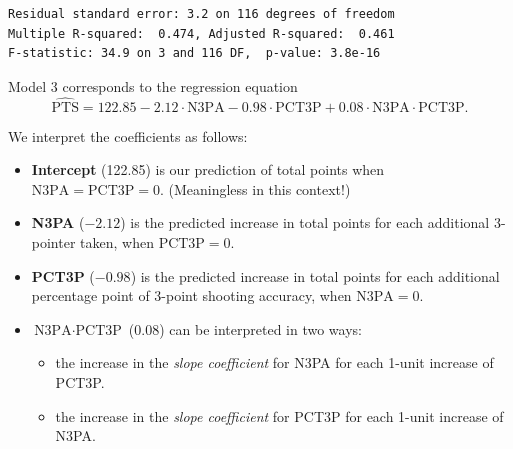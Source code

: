 \documentclass{beamer}\usepackage[]{graphicx}\usepackage[]{color}
\makeatletter
\newenvironment{kframe}{%
 \def\at@end@of@kframe{}%
 \ifinner\ifhmode%
  \def\at@end@of@kframe{\end{minipage}}%
  \begin{minipage}{\columnwidth}%
 \fi\fi%
 \def\FrameCommand##1{\hskip\@totalleftmargin \hskip-\fboxsep
 \colorbox{shadecolor}{##1}\hskip-\fboxsep
     \hskip-\linewidth \hskip-\@totalleftmargin \hskip\columnwidth}%
 \MakeFramed {\advance\hsize-\width
   \@totalleftmargin\z@ \linewidth\hsize
   \@setminipage}}%
 {\par\unskip\endMakeFramed%
 \at@end@of@kframe}
\newenvironment{knitrout}{}{} %
\makeatother
\begin{document}
\begin{darkframes}
\begin{frame}[fragile]
\begin{knitrout}
\begin{kframe}
\begin{verbatim}
Residual standard error: 3.2 on 116 degrees of freedom
Multiple R-squared:  0.474,	Adjusted R-squared:  0.461 
F-statistic: 34.9 on 3 and 116 DF,  p-value: 3.8e-16
\end{verbatim}
\end{kframe}
\end{knitrout}
\end{frame}

\begin{frame}[fragile]

      Model 3 corresponds to the regression equation
      \[
        \widehat{\text{PTS}} = 122.85 
          - 2.12 \cdot\text{N3PA}
          - 0.98 \cdot\text{PCT3P}
          + 0.08 \cdot\text{N3PA}\cdot\text{PCT3P}.
      \]

      \pause

      We interpret the coefficients as follows:
      \begin{itemize}[<+->]
        \item \textbf{Intercept} (122.85) is our prediction of total points when $\text{N3PA}=\text{PCT3P}=0$. (Meaningless in this context!)
        \item \textbf{N3PA} ($-2.12$) is the predicted increase in total points for each additional 3-pointer taken, when $\text{PCT3P}=0$.
        \item \textbf{PCT3P} ($-0.98$)  is the predicted increase in total points for each additional percentage point of 3-point shooting accuracy, when $\text{N3PA}=0$.
        \item \textbf{$\text{N3PA}\cdot\text{PCT3P}$} ($0.08$) can be interpreted in two ways:\pause
          \begin{itemize}[<+->]
            \item the increase in the \emph{slope coefficient} for N3PA for each 1-unit increase of PCT3P.
            \item the increase in the \emph{slope coefficient} for PCT3P for each 1-unit increase of N3PA.
          \end{itemize}
      \end{itemize}
      \lc
\end{frame}

    \begin{frame}
\begin{knitrout}


\end{knitrout}
    \end{frame}


\end{darkframes}
\end{document}
